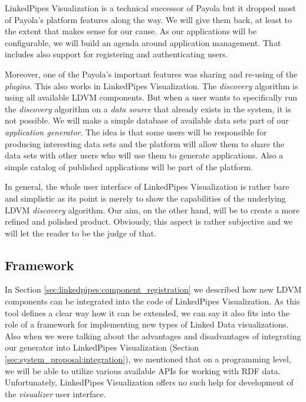 LinkedPipes Visualization is a technical successor of Payola but it dropped most of Payola's platform features along the way. We will give them back, at least to the extent that makes sense for our cause. As our applications will be configurable, we will build an agenda around application management. That includes also support for registering and authenticating users.

Moreover, one of the Payola's important features was sharing and re-using of the \emph{plugins}. This also works in LinkedPipes Visualization. The \emph{discovery} algorithm is using all available LDVM components. But when a user wants to specifically run the \emph{discovery} algorithm on a \emph{data source} that already exists in the system, it is not possible. We will make a simple database of available data sets part of our \emph{application generator}. The idea is that some users will be responsible for producing interesting data sets and the platform will allow them to share the data sets with other users who will use them to generate applications. Also a simple catalog of published applications will be part of the platform.

In general, the whole user interface of LinkedPipes Visualization is rather bare and simplistic as its point is merely to show the capabilities of the underlying LDVM \emph{discovery} algorithm. Our aim, on the other hand, will be to create a more refined and polished product. Obviously, this aspect is rather subjective and we will let the reader to be the judge of that.

\subsection{Framework}

In Section \ref{sec:linkedpipes:component_registration} we described how new LDVM components  can be integrated into the code of LinkedPipes Visualization. As this tool defines a clear way how it can be extended, we can say it also fits into the role of a framework for implementing new types of Linked Data visualizations. Also when we were talking about the advantages and disadvantages of integrating our generator into LinkedPipes Visualization (Section \ref{sec:system_proposal:integration}), we mentioned that on a programming level, we will be able to utilize various available APIs for working with RDF data. Unfortunately, LinkedPipes Visualization offers no such help for development of the \emph{visualizer} user interface.

